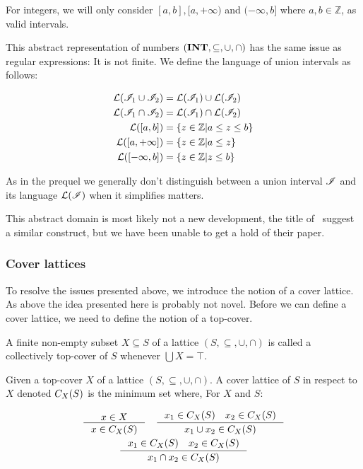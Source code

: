 For integers, we will only consider $[a, b], [a, +\infty)$ and $(-\infty, b]$ where $a, b \in \mathbb{Z}$, as valid intervals.

This abstract representation of numbers $(\mathbf{INT}, \subseteq, \cup, \cap)$ has the same issue as regular expressions: It is not finite.
We define the language of union intervals as follows:


\begin{align}
    \mathcal{L}(\mathscr{I}_1 \cup \mathscr{I}_2) &= \mathcal{L}(\mathscr{I}_1) \cup \mathcal{L}(\mathscr{I}_2) \\
    \mathcal{L}(\mathscr{I}_1 \cap \mathscr{I}_2) &= \mathcal{L}(\mathscr{I}_1) \cap \mathcal{L}(\mathscr{I}_2) \\
    \mathcal{L}([a, b]) &= \left\{ z \in \mathbb{Z} \middle| a \leq z \leq b \right\} \\
    \mathcal{L}([a, +\infty]) &= \left\{ z \in \mathbb{Z} \middle| a \leq z \right\} \\
    \mathcal{L}([-\infty, b]) &= \left\{ z \in \mathbb{Z} \middle| z \leq b \right\}
\end{align}


As in the prequel we generally don't distinguish between a union interval $\mathscr{I}$ and its language $\mathcal{L}(\mathscr{I})$ when it simplifies matters.

This abstract domain is most likely not a new development, the title of~\cite{li2010abstract} suggest a similar construct, but we have been unable to get a hold of their paper.

\subsubsection{Cover lattices}\label{subsubsec:cover-lattice}
To resolve the issues presented above, we introduce the notion of a cover lattice.
As above the idea presented here is probably not novel.
Before we can define a cover lattice, we need to define the notion of a top-cover.

\begin{definition}
    A finite non-empty subset $X \subseteq S$ of a lattice $(S, \subseteq, \cup, \cap)$ is called a collectively top-cover of $S$ whenever $\bigcup X = \top$.
\end{definition}

\begin{definition}\label{def:coverlattice}
Given a top-cover $X$ of a lattice $(S, \subseteq, \cup, \cap)$.
A cover lattice of $S$ in respect to $X$ denoted $C_{X}(S)$ is the minimum set where,
For $X$ and $S$:


\begin{gather*}
    \inference{x \in X}{x \in C_X(S)} \quad
    \inference{x_1 \in C_X(S) \quad x_2 \in C_X(S)}{x_1 \cup  x_2 \in C_X(S)}\\
    \inference{x_1 \in C_X(S) \quad x_2 \in C_X(S)}{x_1 \cap  x_2 \in C_X(S)}
\end{gather*}
\end{definition}

